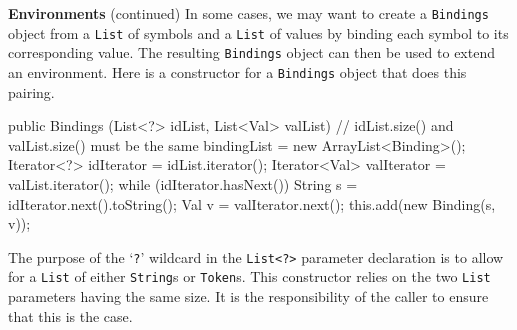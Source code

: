 \begin{minipage}[t]{\sw}
\slidenumber
\LARGE
{\bf Environments} (continued)\exx
In some cases, we may want to create a \verb'Bindings' object
from a \verb'List' of symbols and a \verb'List' of values
by binding each symbol to its corresponding value.
The resulting \verb'Bindings' object can then be used
to extend an environment.
Here is a constructor for a \verb'Bindings' object
that does this pairing.
\Large
\begin{qv}
public Bindings (List<?> idList, List<Val> valList) {
    // idList.size() and valList.size() must be the same
    bindingList = new ArrayList<Binding>();
    Iterator<?> idIterator = idList.iterator();
    Iterator<Val> valIterator = valList.iterator();
    while (idIterator.hasNext()) {
        String s = idIterator.next().toString();
        Val v = valIterator.next();
        this.add(new Binding(s, v));
    }
}
\end{qv}
\LARGE
The purpose of the `\verb'?'' wildcard
in the \verb'List<?>' parameter declaration
is to allow for a \verb'List' of either \verb'String's or \verb'Token's.\exx
This constructor relies on the two \verb'List' parameters
having the same size.
It is the responsibility of the caller to ensure
that this is the case.
\end{minipage}
\clearpage
